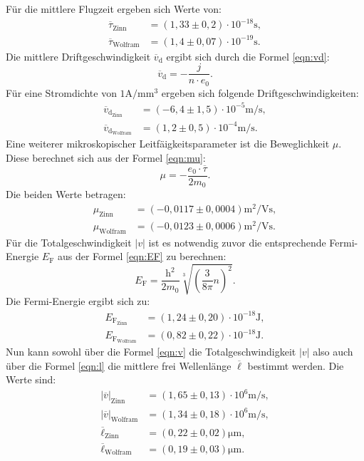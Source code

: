 Für die mittlere Flugzeit ergeben sich Werte von:
\begin{align*}
\overline{\tau}_\mathrm{Zinn}&=(1,33\pm0,2)\cdot10^{-18}\si{\second},\\
\overline{\tau}_\mathrm{Wolfram}&=(1,4\pm0,07)\cdot10^{-19}\si{\second}.
\end{align*}
Die mittlere Driftgeschwindigkeit $\overline{v}_\mathrm{d}$ ergibt sich durch die Formel \eqref{eqn:vd}:
\begin{equation}
  \overline{v}_\mathrm{d}=-\frac{j}{n \cdot e_0}\label{eqn:vd}.
\end{equation}
Für eine Stromdichte von $1\si{\ampere\per\milli\meter\tothe{3}}$ ergeben sich folgende Driftgeschwindigkeiten:
\begin{align}
\overline{v}_\mathrm{d_\mathrm{Zinn}}&=(-6,4\pm1,5)\cdot10^{-5}\si{\meter\per\second},\\
\overline{v}_\mathrm{d_\mathrm{Wolfram}}&=(1,2\pm0,5)\cdot10^{-4}\si{\meter\per\second}.
\end{align}
Eine weiterer mikroskopischer Leitfäigkeitsparameter ist die Beweglichkeit $\mu$.
Diese berechnet sich aus der Formel \eqref{eqn:mu}:
\begin{equation}
\mu=-\frac{e_0\cdot\overline{\tau}}{2m_0}\label{eqn:mu}.
\end{equation}
Die beiden Werte betragen:
\begin{align*}
\mu_\mathrm{Zinn}&=(-0,0117\pm0,0004)\si{\square\meter\per\volt\second},\\
\mu_\mathrm{Wolfram}&=(-0,0123\pm0,0006)\si{\square\meter\per\volt\second}.
\end{align*}
Für die Totalgeschwindigkeit $|v|$ ist es notwendig zuvor die entsprechende Fermi-Energie
$E_\mathrm{F}$ aus der Formel \eqref{eqn:EF} zu berechnen:
\begin{equation}
E_\mathrm{F}=\frac{\mathrm{h}^2}{2m_0}\sqrt[3]{\left(\frac{3}{8\pi}n\right)^2}\label{eqn:EF}.
\end{equation}
Die Fermi-Energie ergibt sich zu:
\begin{align*}
E_\mathrm{F_\mathrm{Zinn}}&=(1,24\pm0,20)\cdot10^{-18}\si{\joule},\\
E_\mathrm{F_\mathrm{Wolfram}}&=(0,82\pm0,22)\cdot10^{-18}\si{\joule}.
\end{align*}
Nun  kann sowohl über die Formel \ref{eqn:v} die Totalgeschwindigkeit $|v|$ also auch
über die Formel \ref{eqn:l} die mittlere frei Wellenlänge  $\overline{\ell}$ bestimmt werden.
Die Werte sind:
\begin{align*}
  |\overline{v}|_\mathrm{Zinn}&=(1,65\pm0,13)\cdot10^{6}\si{\meter\per\second},\\
  |\overline{v}|_\mathrm{Wolfram}&=(1,34\pm0,18)\cdot10^{6}\si{\meter\per\second},\\
  \overline{\ell}_\mathrm{Zinn}&=(0,22\pm0,02)\si{\micro\meter},\\
  \overline{\ell}_\mathrm{Wolfram}&=(0,19\pm0,03)\si{\micro\meter}.
\end{align*}
